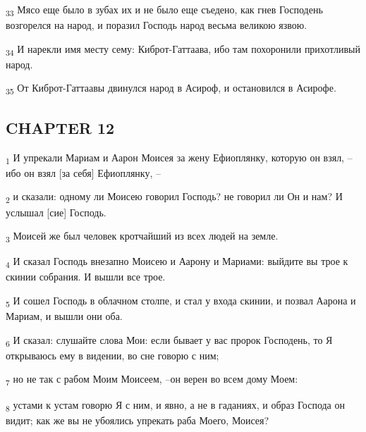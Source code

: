 \begin{tcolorbox}
\textsubscript{33} Мясо еще было в зубах их и не было еще съедено, как гнев Господень возгорелся на народ, и поразил Господь народ весьма великою язвою.
\end{tcolorbox}
\begin{tcolorbox}
\textsubscript{34} И нарекли имя месту сему: Киброт-Гаттаава, ибо там похоронили прихотливый народ.
\end{tcolorbox}
\begin{tcolorbox}
\textsubscript{35} От Киброт-Гаттаавы двинулся народ в Асироф, и остановился в Асирофе.
\end{tcolorbox}
\subsection{CHAPTER 12}
\begin{tcolorbox}
\textsubscript{1} И упрекали Мариам и Аарон Моисея за жену Ефиоплянку, которую он взял, --ибо он взял [за себя] Ефиоплянку, --
\end{tcolorbox}
\begin{tcolorbox}
\textsubscript{2} и сказали: одному ли Моисею говорил Господь? не говорил ли Он и нам? И услышал [сие] Господь.
\end{tcolorbox}
\begin{tcolorbox}
\textsubscript{3} Моисей же был человек кротчайший из всех людей на земле.
\end{tcolorbox}
\begin{tcolorbox}
\textsubscript{4} И сказал Господь внезапно Моисею и Аарону и Мариами: выйдите вы трое к скинии собрания. И вышли все трое.
\end{tcolorbox}
\begin{tcolorbox}
\textsubscript{5} И сошел Господь в облачном столпе, и стал у входа скинии, и позвал Аарона и Мариам, и вышли они оба.
\end{tcolorbox}
\begin{tcolorbox}
\textsubscript{6} И сказал: слушайте слова Мои: если бывает у вас пророк Господень, то Я открываюсь ему в видении, во сне говорю с ним;
\end{tcolorbox}
\begin{tcolorbox}
\textsubscript{7} но не так с рабом Моим Моисеем, --он верен во всем дому Моем:
\end{tcolorbox}
\begin{tcolorbox}
\textsubscript{8} устами к устам говорю Я с ним, и явно, а не в гаданиях, и образ Господа он видит; как же вы не убоялись упрекать раба Моего, Моисея?
\end{tcolorbox}

